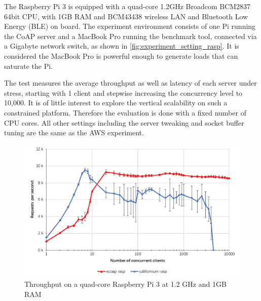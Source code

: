 The Raspberry Pi 3 is equipped with a quad-core 1.2GHz Broadcom BCM2837 64bit CPU, with 1GB RAM and BCM43438 wireless LAN and Bluetooth Low Energy (BLE) on board. The experiment environment consists of one Pi running the CoAP server and a MacBook Pro running the benchmark tool, connected via a Gigabyte network switch, as shown in \autoref{fig:experiment_setting_rasp}. It is considered the MacBook Pro is powerful enough to generate loads that can saturate the Pi. 

The test measures the average throughput as well as latency of each server under stress, starting with 1 client and stepwise increasing the concurrency level to 10,000. It is of little interest to explore the vertical scalability on such a constrained platform. Therefore the evaluation is done with a fixed number of CPU cores. All other settings including the server tweaking and socket buffer tuning are the same as the AWS experiment.

\begin{figure}[!htbp]
\centering
\includegraphics[scale = 0.7]{throughput_rasp}
\caption{Throughput on a quad-core Raspberry Pi 3 at 1.2 GHz and 1GB RAM}
\label{fig:throughput_rasp}
\end{figure}

